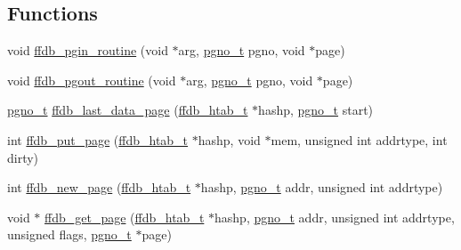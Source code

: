 \subsection*{Functions}
\begin{DoxyCompactItemize}
\item 
void \mbox{\hyperlink{adat-devel_2other__libs_2filedb_2filehash_2ffdb__page_8c_a1af7c7a984e68481194b1457fc9e2165}{ffdb\+\_\+pgin\+\_\+routine}} (void $\ast$arg, \mbox{\hyperlink{adat-devel_2other__libs_2filedb_2filehash_2ffdb__db_8h_a000813331643d38481142bcce7de1501}{pgno\+\_\+t}} pgno, void $\ast$page)
\item 
void \mbox{\hyperlink{adat-devel_2other__libs_2filedb_2filehash_2ffdb__page_8c_a29e873047c5bbb8214d85f3061c2b48c}{ffdb\+\_\+pgout\+\_\+routine}} (void $\ast$arg, \mbox{\hyperlink{adat-devel_2other__libs_2filedb_2filehash_2ffdb__db_8h_a000813331643d38481142bcce7de1501}{pgno\+\_\+t}} pgno, void $\ast$page)
\item 
\mbox{\hyperlink{adat-devel_2other__libs_2filedb_2filehash_2ffdb__db_8h_a000813331643d38481142bcce7de1501}{pgno\+\_\+t}} \mbox{\hyperlink{adat-devel_2other__libs_2filedb_2filehash_2ffdb__page_8c_ab18204b922b3c1431b8bcbd71fbe19d7}{ffdb\+\_\+last\+\_\+data\+\_\+page}} (\mbox{\hyperlink{adat-devel_2other__libs_2filedb_2filehash_2ffdb__hash_8h_ae592010ed2bedc975d3cc0b7d074b9d1}{ffdb\+\_\+htab\+\_\+t}} $\ast$hashp, \mbox{\hyperlink{adat-devel_2other__libs_2filedb_2filehash_2ffdb__db_8h_a000813331643d38481142bcce7de1501}{pgno\+\_\+t}} start)
\item 
int \mbox{\hyperlink{adat-devel_2other__libs_2filedb_2filehash_2ffdb__page_8c_aee8d402020a44a72f40cff30ae2f9bd9}{ffdb\+\_\+put\+\_\+page}} (\mbox{\hyperlink{adat-devel_2other__libs_2filedb_2filehash_2ffdb__hash_8h_ae592010ed2bedc975d3cc0b7d074b9d1}{ffdb\+\_\+htab\+\_\+t}} $\ast$hashp, void $\ast$mem, unsigned int addrtype, int dirty)
\item 
int \mbox{\hyperlink{adat-devel_2other__libs_2filedb_2filehash_2ffdb__page_8c_a3781c690210dc9ff030bca63ca76b521}{ffdb\+\_\+new\+\_\+page}} (\mbox{\hyperlink{adat-devel_2other__libs_2filedb_2filehash_2ffdb__hash_8h_ae592010ed2bedc975d3cc0b7d074b9d1}{ffdb\+\_\+htab\+\_\+t}} $\ast$hashp, \mbox{\hyperlink{adat-devel_2other__libs_2filedb_2filehash_2ffdb__db_8h_a000813331643d38481142bcce7de1501}{pgno\+\_\+t}} addr, unsigned int addrtype)
\item 
void $\ast$ \mbox{\hyperlink{adat-devel_2other__libs_2filedb_2filehash_2ffdb__page_8c_a7a41e5d3aa641eaa3588ee323469147a}{ffdb\+\_\+get\+\_\+page}} (\mbox{\hyperlink{adat-devel_2other__libs_2filedb_2filehash_2ffdb__hash_8h_ae592010ed2bedc975d3cc0b7d074b9d1}{ffdb\+\_\+htab\+\_\+t}} $\ast$hashp, \mbox{\hyperlink{adat-devel_2other__libs_2filedb_2filehash_2ffdb__db_8h_a000813331643d38481142bcce7de1501}{pgno\+\_\+t}} addr, unsigned int addrtype, unsigned flags, \mbox{\hyperlink{adat-devel_2other__libs_2filedb_2filehash_2ffdb__db_8h_a000813331643d38481142bcce7de1501}{pgno\+\_\+t}} $\ast$page)

\end{DoxyCompactItemize}
